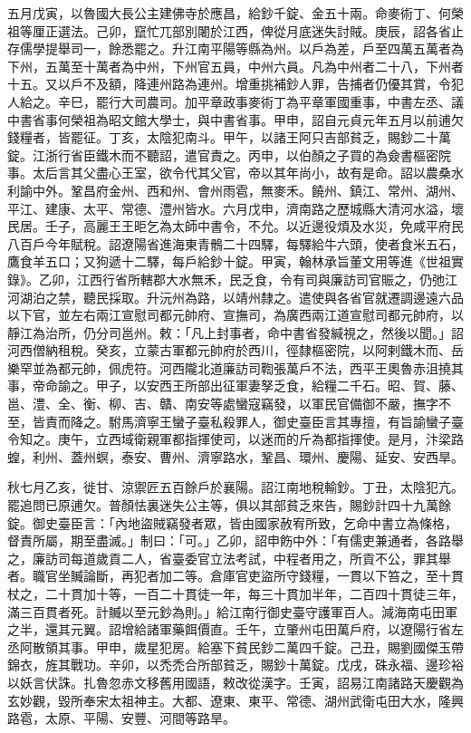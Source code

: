 \begin{pinyinscope}
 五月戊寅，以魯國大長公主建佛寺於應昌，給鈔千錠、金五十兩。命麥術丁、何榮祖等厘正選法。己卯，竄忙兀部別闍於江西，俾從月底迷失討賊。庚辰，詔各省止存儒學提舉司一，餘悉罷之。升江南平陽等縣為州。以戶為差，戶至四萬五萬者為下州，五萬至十萬者為中州，下州官五員，中州六員。凡為中州者二十八，下州者十五。又以戶不及額，降連州路為連州。增重挑補鈔人罪，告捕者仍優其賞，令犯人給之。辛巳，罷行大司農司。加平章政事麥術丁為平章軍國重事，中書左丞、議中書省事何榮祖為昭文館大學士，與中書省事。甲申，詔自元貞元年五月以前逋欠錢糧者，皆罷征。丁亥，太陰犯南斗。甲午，以諸王阿只吉部貧乏，賜鈔二十萬錠。江浙行省臣鐵木而不聽詔，遣官責之。丙申，以伯顏之子買的為僉書樞密院事。太后言其父盡心王室，欲令代其父官，帝以其年尚小，故有是命。詔以農桑水利諭中外。鞏昌府金州、西和州、會州雨雹，無麥禾。饒州、鎮江、常州、湖州、平江、建康、太平、常德、澧州皆水。六月戊申，濟南路之歷城縣大清河水溢，壞民居。壬子，高麗王王昛乞為太師中書令，不允。以近邊役煩及水災，免咸平府民八百戶今年賦稅。詔遼陽省進海東青鶻二十四驛，每驛給牛六頭，使者食米五石，鷹食羊五口；又狗遞十二驛，每戶給鈔十錠。甲寅，翰林承旨董文用等進《世祖實錄》。乙卯，江西行省所轄郡大水無禾，民乏食，令有司與廉訪司官賑之，仍弛江河湖泊之禁，聽民採取。升沅州為路，以靖州隸之。遣使與各省官就遷調邊遠六品以下官，並左右兩江宣慰司都元帥府、宣撫司，為廣西兩江道宣慰司都元帥府，以靜江為治所，仍分司邕州。敕：「凡上封事者，命中書省發緘視之，然後以聞。」詔河西僧納租稅。癸亥，立蒙古軍都元帥府於西川，徑隸樞密院，以阿剌鐵木而、岳樂罕並為都元帥，佩虎符。河西隴北道廉訪司鞫張萬戶不法，西平王奧魯赤沮撓其事，帝命諭之。甲子，以安西王所部出征軍妻孥乏食，給糧二千石。昭、賀、藤、邕、澧、全、衡、柳、吉、贛、南安等處蠻寇竊發，以軍民官備御不嚴，撫字不至，皆責而降之。駙馬濟寧王蠻子臺私殺罪人，御史臺臣言其專擅，有旨諭蠻子臺令知之。庚午，立西域衛親軍都指揮使司，以迷而的斤為都指揮使。是月，汴梁路蝗，利州、蓋州螟，泰安、曹州、濟寧路水，鞏昌、環州、慶陽、延安、安西旱。



 秋七月乙亥，徙甘、涼禦匠五百餘戶於襄陽。詔江南地稅輸鈔。丁丑，太陰犯亢。罷追問已原逋欠。普顏怯裏迷失公主等，俱以其部貧乏來告，賜鈔計四十九萬餘錠。御史臺臣言：「內地盜賊竊發者眾，皆由國家赦宥所致，乞命中書立為條格，督責所屬，期至盡滅。」制曰：「可。」乙卯，詔申飭中外：「有儒吏兼通者，各路舉之，廉訪司每道歲貢二人，省臺委官立法考試，中程者用之，所貢不公，罪其舉者。職官坐贓論斷，再犯者加二等。倉庫官吏盜所守錢糧，一貫以下笞之，至十貫杖之，二十貫加十等，一百二十貫徒一年，每三十貫加半年，二百四十貫徒三年，滿三百貫者死。計贓以至元鈔為則。」給江南行御史臺守護軍百人。減海南屯田軍之半，還其元翼。詔增給諸軍藥餌價直。壬午，立肇州屯田萬戶府，以遼陽行省左丞阿散領其事。甲申，歲星犯房。給塞下貧民鈔二萬四千錠。己丑，賜劉國傑玉帶錦衣，旌其戰功。辛卯，以禿禿合所部貧乏，賜鈔十萬錠。戊戌，硃永福、邊珍裕以妖言伏誅。扎魯忽赤文移舊用國語，敕改從漢字。壬寅，詔易江南諸路天慶觀為玄妙觀，毀所奉宋太祖神主。大都、遼東、東平、常德、湖州武衛屯田大水，隆興路雹，太原、平陽、安豐、河間等路旱。




\end{pinyinscope}

